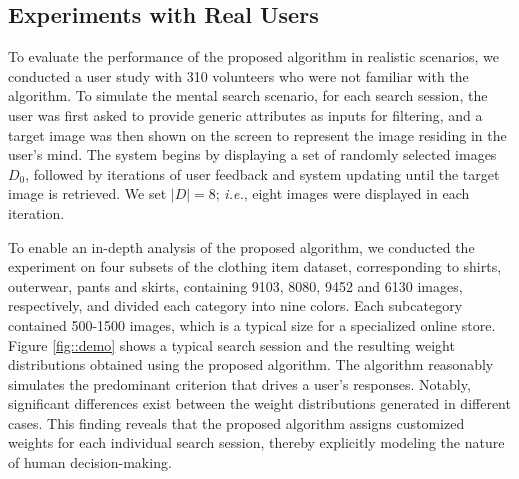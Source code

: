 \documentclass[journal]{IEEEtran}
\begin{document}
\subsection{Experiments with Real Users}\label{subsec::realuser}
To evaluate the performance of the proposed algorithm in realistic scenarios, we conducted a user study with 310 volunteers who were not familiar with the algorithm. To simulate the mental search scenario, for each search session, the user was first asked to provide generic attributes as inputs for filtering, and a target image was then shown on the screen to represent the image residing in the user's mind. The system begins by displaying a set of randomly selected images $D_0$, followed by iterations of user feedback and system updating until the target image is retrieved. We set $|D|=8$; \textit{i.e.}, eight images were displayed in each iteration.

To enable an in-depth analysis of the proposed algorithm, we conducted the experiment on four subsets of the clothing item dataset, corresponding to shirts, outerwear, pants and skirts, containing 9103, 8080, 9452 and 6130 images, respectively, and divided each category into nine colors. Each subcategory contained 500-1500 images, which is a typical size for a specialized online store.
Figure \ref{fig::demo} shows a typical search session and the resulting weight distributions obtained using the proposed algorithm. The algorithm reasonably simulates the predominant criterion that drives a user's responses. Notably, significant differences exist between the weight distributions generated in different cases. This finding reveals that the proposed algorithm assigns customized weights for each individual search session, thereby explicitly modeling the nature of human decision-making.
\end{document}
